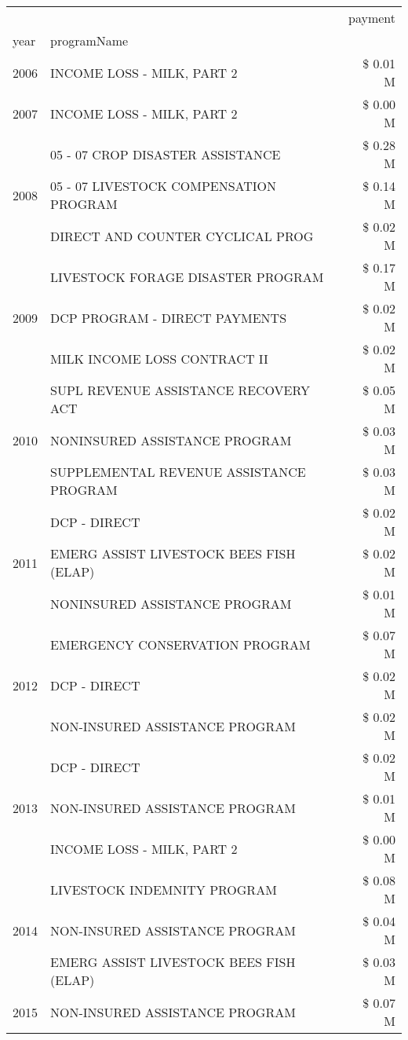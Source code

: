 \begin{tabular}{llr}
\toprule
 &  & payment \\
year & programName &  \\
\midrule
2006 & INCOME LOSS - MILK, PART 2 & \$ 0.01 M \\
\cline{1-3}
2007 & INCOME LOSS - MILK, PART 2 & \$ 0.00 M \\
\cline{1-3}
\multirow[t]{3}{*}{2008} & 05 - 07 CROP DISASTER ASSISTANCE & \$ 0.28 M \\
 & 05 - 07 LIVESTOCK COMPENSATION PROGRAM & \$ 0.14 M \\
 & DIRECT AND COUNTER CYCLICAL PROG & \$ 0.02 M \\
\cline{1-3}
\multirow[t]{3}{*}{2009} & LIVESTOCK FORAGE DISASTER  PROGRAM & \$ 0.17 M \\
 & DCP PROGRAM - DIRECT PAYMENTS & \$ 0.02 M \\
 & MILK INCOME LOSS CONTRACT II & \$ 0.02 M \\
\cline{1-3}
\multirow[t]{3}{*}{2010} & SUPL REVENUE ASSISTANCE RECOVERY ACT & \$ 0.05 M \\
 & NONINSURED ASSISTANCE PROGRAM & \$ 0.03 M \\
 & SUPPLEMENTAL REVENUE ASSISTANCE PROGRAM & \$ 0.03 M \\
\cline{1-3}
\multirow[t]{3}{*}{2011} & DCP - DIRECT & \$ 0.02 M \\
 & EMERG ASSIST LIVESTOCK BEES FISH (ELAP) & \$ 0.02 M \\
 & NONINSURED ASSISTANCE PROGRAM & \$ 0.01 M \\
\cline{1-3}
\multirow[t]{3}{*}{2012} & EMERGENCY CONSERVATION PROGRAM & \$ 0.07 M \\
 & DCP - DIRECT & \$ 0.02 M \\
 & NON-INSURED ASSISTANCE PROGRAM & \$ 0.02 M \\
\cline{1-3}
\multirow[t]{3}{*}{2013} & DCP - DIRECT & \$ 0.02 M \\
 & NON-INSURED ASSISTANCE PROGRAM & \$ 0.01 M \\
 & INCOME LOSS - MILK, PART 2 & \$ 0.00 M \\
\cline{1-3}
\multirow[t]{3}{*}{2014} & LIVESTOCK INDEMNITY PROGRAM & \$ 0.08 M \\
 & NON-INSURED ASSISTANCE PROGRAM & \$ 0.04 M \\
 & EMERG ASSIST LIVESTOCK BEES FISH (ELAP) & \$ 0.03 M \\
\cline{1-3}
\multirow[t]{3}{*}{2015} & NON-INSURED ASSISTANCE PROGRAM & \$ 0.07 M \\

\end{tabular}
